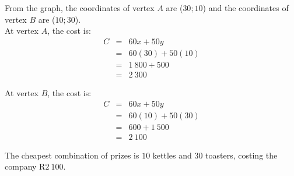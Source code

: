 \begin{wex}
{
From the graph, the coordinates of vertex $A$ are ($30;10$) and the coordinates of vertex $B$ are ($10;30$).\\

At vertex $A$, the cost is:
\begin{eqnarray*}
C&=&60x+50y\\
&=&60(30)+50(10)\\
&=&1~800+500\\
&=&2~300
\end{eqnarray*}

At vertex $B$, the cost is:
\begin{eqnarray*}
C&=&60x+50y\\
&=&60(10)+50(30)\\
&=&600+1~500\\
&=&2~100
\end{eqnarray*}

The cheapest combination of prizes is $10$ kettles and $30$ toasters, costing the company R$2~100$.
}
\end{wex}

